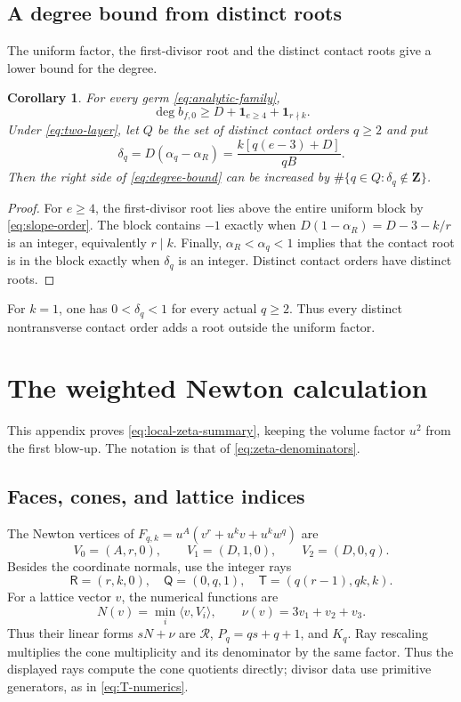 \documentclass[11pt]{article}
\numberwithin{equation}{section}
\newtheorem{corollary}[theorem]{Corollary}
\theoremstyle{definition}
\theoremstyle{remark}
\newcommand{\ZZ}{\mathbf Z}
\newcommand{\bfzero}{b_{f,0}}
\begin{document}
\subsection{A degree bound from distinct roots}

The uniform factor, the first-divisor root and the
distinct contact roots give a lower bound for the degree.

\begin{corollary}\label{cor:degree}
For every germ \eqref{eq:analytic-family},
\begin{equation}\label{eq:degree-bound}
 \deg\bfzero\ge D+\mathbf1_{e\ge4}+\mathbf1_{r\nmid k}.
\end{equation}
Under \eqref{eq:two-layer}, let $Q$ be the set of distinct
contact orders $q\ge2$ and put
\[
 \delta_q=D(\alpha_q-\alpha_R)
          =\frac{k[q(e-3)+D]}{qB}.
\]
Then the right side of \eqref{eq:degree-bound} can be
increased by $\#\{q\in Q:\delta_q\notin\ZZ\}$.
\end{corollary}

\begin{proof}
For $e\ge4$, the first-divisor root lies above the entire
uniform block by \eqref{eq:slope-order}. The block contains
$-1$ exactly when $D(1-\alpha_R)=D-3-k/r$ is an integer,
equivalently $r\mid k$. Finally,
$\alpha_R<\alpha_q<1$ implies that the contact root is
in the block exactly when $\delta_q$ is an integer.
Distinct contact orders have distinct roots.
\end{proof}

For $k=1$, one has $0<\delta_q<1$ for every actual
$q\ge2$. Thus every distinct nontransverse contact order
adds a root outside the uniform factor.

\appendix
\section{The weighted Newton calculation}\label{app:newton}

This appendix proves \eqref{eq:local-zeta-summary}, keeping
the volume factor $u^2$ from the first blow-up. The
notation is that of \eqref{eq:zeta-denominators}.

\subsection{Faces, cones, and lattice indices}

The Newton vertices of
$F_{q,k}=u^A(v^r+u^kv+u^kw^q)$ are
\[
 V_0=(A,r,0),\qquad V_1=(D,1,0),\qquad V_2=(D,0,q).
\]
Besides the coordinate normals, use the integer rays
\[
 \mathsf R=(r,k,0),\quad \mathsf Q=(0,q,1),\quad
 \mathsf T=(q(r-1),qk,k).
\]
For a lattice vector $v$, the numerical functions are
\[
 N(v)=\min_i\langle v,V_i\rangle,\qquad
 \nu(v)=3v_1+v_2+v_3.
\]
Thus their linear forms $sN+\nu$ are $\mathcal R$,
$P_q=qs+q+1$, and $K_q$.
Ray rescaling multiplies the cone multiplicity and its
denominator by the same factor. Thus the displayed rays
compute the cone quotients directly; divisor data use
primitive generators, as in \eqref{eq:T-numerics}.
\end{document}
